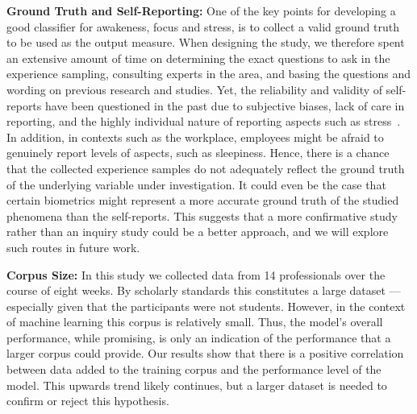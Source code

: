 \vspace{0.05in}
\noindent
\textbf{Ground Truth and Self-Reporting:} 
One of the key points for developing a good classifier for awakeness, focus and stress, is to collect a valid ground truth to be used as the output measure. When designing the study, we therefore spent an extensive amount of time on determining the exact questions to ask in the experience sampling, consulting experts in the area, and basing the questions and wording on previous research and studies. Yet, the reliability and validity of self-reports have been questioned in the past due to subjective biases, lack of care in reporting, and the highly individual nature of reporting aspects such as stress~\cite{Hernandez11,Hovsepian15}. In addition, in contexts such as the workplace, employees might be afraid to genuinely report levels of aspects, such as sleepiness. Hence, there is a chance that the collected experience samples do not adequately reflect the ground truth of the underlying variable under investigation. It could even be the case that certain biometrics might represent a more accurate ground truth of the studied phenomena than the self-reports. This suggests that a more confirmative study rather than an inquiry study could be a better approach, and we will explore such routes in future work.


\vspace{0.05in}
\noindent
\textbf{Corpus Size:}
In this study we collected data from 14 professionals over the course of eight weeks. By scholarly standards this constitutes a large dataset --- especially given that the participants were not students. However, in the context of machine learning this corpus is relatively small. Thus, the model's overall performance, while promising, is only an indication of the performance that a larger corpus could provide. Our results show that there is a positive correlation between data added to the training corpus and the performance level of the model. This upwards trend likely continues, but a larger dataset is needed to confirm or reject this hypothesis. 


